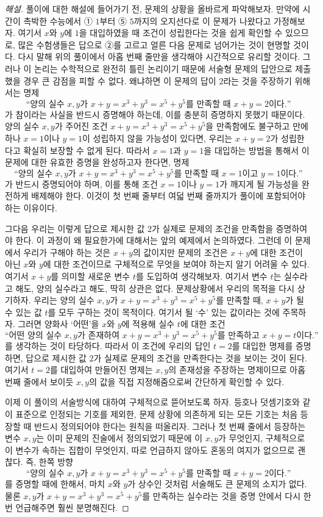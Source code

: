 \documentclass{../../large}
\begin{document}
\begin{proof}[해설]
풀이에 대한 해설에 들어가기 전, 문제의 상황을 올바르게 파악해보자.
만약에 시간이 촉박한 수능에서 ① $1$부터 ⑤ $5$까지의 오지선다로 이 문제가 나왔다고 가정해보자.
여기서 $x$와 $y$에 $1$을 대입하였을 때 조건이 성립한다는 것을 쉽게 확인할 수 있으므로, 많은 수험생들은 답으로 ②를 고르고 얼른 다음 문제로 넘어가는 것이 현명할 것이다.
다시 말해 위의 풀이에서 아홉 번째 줄만을 생각해야 시간적으로 유리할 것이다.
그러나 이 논리는 수학적으로 완전히 틀린 논리이기 때문에 서술형 문제의 답안으로 제출했을 경우 큰 감점을 피할 수 없다.
왜냐하면 이 문제의 답이 $2$라는 것을 주장하기 위해서는 명제
\[\text{``양의 실수 $x,y$가 $x+y=x^3+y^3=x^5+y^5$를 만족할 때 $x+y=2$이다.''}\]
가 참이라는 사실을 반드시 증명해야 하는데, 이를 충분히 증명하지 못했기 때문이다.
양의 실수 $x,y$가 주어진 조건 $x+y=x^3+y^3=x^5+y^5$을 만족함에도 불구하고 만에 하나 $x=1$이나 $y=1$이 성립하지 않을 가능성이 있다면, 우리는 $x+y=2$가 성립한다고 확실히 보장할 수 없게 된다.
따라서 $x=1$과 $y=1$을 대입하는 방법을 통해서 이 문제에 대한 유효한 증명을 완성하고자 한다면, 명제
\[\text{``양의 실수 $x,y$가 $x+y=x^3+y^3=x^5+y^5$를 만족할 때 $x=1$이고 $y=1$이다.''}\]
가 반드시 증명되어야 하며, 이를 통해 조건 $x=1$이나 $y=1$가 깨지게 될 가능성을 완전하게 배제해야 한다.
이것이 첫 번째 줄부터 여덟 번째 줄까지가 풀이에 포함되어야 하는 이유이다.

그다음 우리는 이렇게 답으로 제시한 값 $2$가 실제로 문제의 조건을 만족함을 증명하여야 한다.
이 과정이 왜 필요한가에 대해서는 앞의 예제에서 논의하였다.
그런데 이 문제에서 우리가 구해야 하는 것은 $x+y$의 값이지만 문제의 조건은 $x+y$에 대한 조건이 아닌 $x$와 $y$에 대한 조건이므로 구체적으로 무엇을 보여야 하는지 알기 어려울 수 있다.
여기서 $x+y$를 의미할 새로운 변수 $t$를 도입하여 생각해보자.
여기서 변수 $t$는 실수라고 해도, 양의 실수라고 해도, 딱히 상관은 없다.
문제상황에서 우리의 목적을 다시 상기하자.
우리는 양의 실수 $x,y$가 $x+y=x^3+y^3=x^5+y^5$를 만족할 때, $x+y$가 될 수 있는 값 $t$를 모두 구하는 것이 목적이다.
여기서 될 `수' 있는 값이라는 것에 주목하자.
그러면 양화사 `어떤'을 $x$와 $y$에 적용해 실수 $t$에 대한 조건
\[\text{``어떤 양의 실수 $x,y$가 존재하여 $x+y=x^3+y^3=x^5+y^5$를 만족하고 $x+y=t$이다.''}\]
를 생각하는 것이 타당하다.
따라서 이 조건에 우리의 답인 $t=2$를 대입한 명제를 증명하면, 답으로 제시한 값 $2$가 실제로 문제의 조건을 만족한다는 것을 보이는 것이 된다.
여기서 $t=2$를 대입하여 만들어진 명제는 $x,y$의 존재성을 주장하는 명제이므로 아홉 번째 줄에서 보이듯 $x,y$의 값을 직접 지정해줌으로써 간단하게 확인할 수 있다.


이제 이 풀이의 서술방식에 대하여 구체적으로 뜯어보도록 하자.
등호나 덧셈기호와 같이 표준으로 인정되는 기호를 제외한, 문제 상황에 의존하게 되는 모든 기호는 처음 등장할 때 반드시 정의되어야 한다는 원칙을 떠올리자.
그러나 첫 번째 줄에서 등장하는 변수 $x,y$는 이미 문제의 진술에서 정의되었기 때문에 이 $x,y$가 무엇인지, 구체적으로 이 변수가 속하는 집합이 무엇인지, 따로 언급하지 않아도 혼동의 여지가 없으므로 괜찮다.
즉, 한쪽 방향
\[\text{``양의 실수 $x,y$가 $x+y=x^3+y^3=x^5+y^5$를 만족할 때 $x+y=2$이다.''}\]
를 증명할 때에 한해서, 마치 $x$와 $y$가 상수인 것처럼 서술해도 큰 문제의 소지가 없다.
물론 $x,y$가 $x+y=x^3+y^3=x^5+y^5$를 만족하는 실수라는 것을 증명 안에서 다시 한 번 언급해주면 훨씬 분명해진다.


\end{proof}
\end{document}
